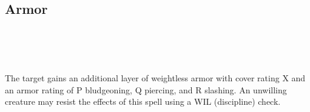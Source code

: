 \subsection*{Armor}
 \\
 \\
 \\

The target gains an additional layer of weightless armor with cover
rating X and an armor rating of P bludgeoning, Q piercing, and R
slashing. An unwilling creature may resist the effects of this spell
using a WIL (discipline) check.

